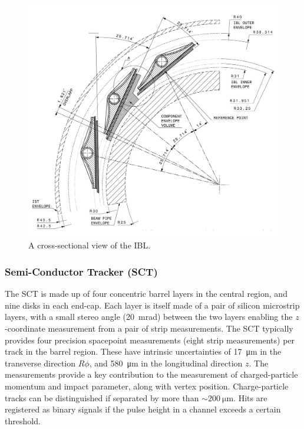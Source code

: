 
\begin{figure}[!htpb]
  \centering
  \includegraphics[width=0.6\linewidth]{chapters/2.detector/figs/atlas_ibl.png}
  \caption{A cross-sectional view of the \ATLAS IBL.}
  \label{fig:atlas_ibl}
\end{figure}

\subsubsection{Semi-Conductor Tracker (SCT)}
The SCT is made up of four concentric barrel layers in the central region, and nine disks in each end-cap.
Each layer is itself made of a pair of silicon microstrip layers, with a small stereo angle (\SI{20}{\milli\radian}) between the two layers enabling the $z$\nobreakdash-coordinate measurement from a pair of strip measurements.
The SCT typically provides four precision spacepoint measurements (eight strip measurements) per track in the barrel region.
These have intrinsic uncertainties of \SI{17}{\micro\meter} in the transverse direction $R\phi$, and \SI{580}{\micro\meter} in the longitudinal direction $z$.
The measurements provide a key contribution to the measurement of charged-particle momentum and impact parameter, along with vertex position.
Charge-particle tracks can be distinguished if separated by more than $\sim \SI{200}{\micro\meter}$.
Hits are registered as binary signals if the pulse height in a channel exceeds a certain threshold.


